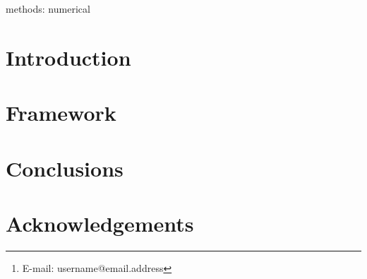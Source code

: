 \documentclass[useAMS,usenatbib]{mn2e}
\date{}
\title[]{}
\author[Author list]%
{First Last \thanks{E-mail: username@email.address}\\%
Institute
}
\begin{document}
\maketitle

\label{firstpage}

\begin{abstract}
\end{abstract}
\begin{keywords}
methods: numerical
\end{keywords}

\section{Introduction}
\label{introduction}

\section{Framework}
\label{framework}

\section{Conclusions}
\label{conclusions}

\section*{Acknowledgements}





\bsp

\label{lastpage}
\end{document}
